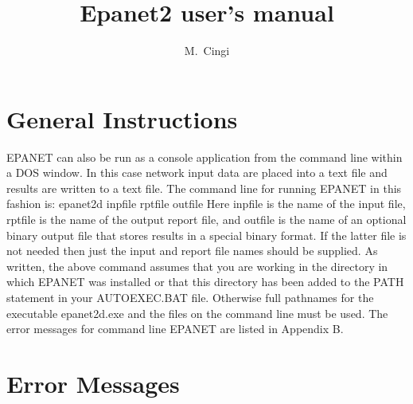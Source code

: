\documentclass[a4paper,11pt]{Report}
\author{M.~Cingi}
\title{Epanet2 user's manual}
\begin{document}
\maketitle

\tableofcontents

\listoftables


\chapter{General Instructions}

EPANET can also be run as a console application from the command line within a
DOS window. In this case network input data are placed into a text file and results
are written to a text file. The command line for running EPANET in this fashion is:
epanet2d inpfile rptfile outfile
Here inpfile is the name of the input file, rptfile is the name of the output
report file, and outfile is the name of an optional binary output file that stores
results in a special binary format. If the latter file is not needed then just the input and
report file names should be supplied. As written, the above command assumes that
you are working in the directory in which EPANET was installed or that this
directory has been added to the PATH statement in your AUTOEXEC.BAT file.
Otherwise full pathnames for the executable epanet2d.exe and the files on the
command line must be used. The error messages for command line EPANET  are listed in Appendix B.





  


\appendix


\chapter{Error Messages}

\end{document}
